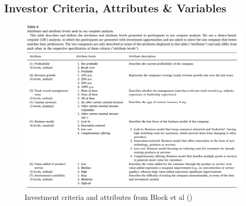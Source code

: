 \documentclass[12pt]{article}
\begin{document}
\subsection{Investor Criteria, Attributes \& Variables}
\begin{figure}[H]
    \centering
    \includegraphics[width=\textwidth]{variables.png}
    \caption{Investment criteria and attributes from Block et al (\citeyear{BLOCK2019329})}
    \label{fig:ica}
\end{figure}
\end{document}
